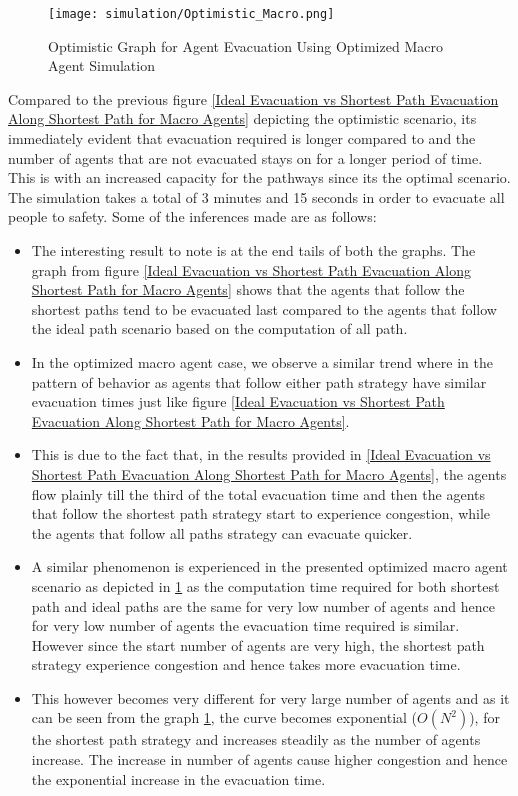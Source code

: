 \begin{figure}[H]
  \centering
  \texttt{[image: simulation/Optimistic\_Macro.png]}
  \caption{Optimistic Graph for Agent Evacuation Using Optimized Macro Agent Simulation}
  \label{Optimistic Graph for Agent Evacuation Using Optimized Macro Agent Simulation}
\end{figure}

Compared to the previous figure \ref{Ideal Evacuation vs Shortest Path Evacuation Along Shortest Path for Macro Agents} depicting the optimistic scenario, its immediately evident that evacuation required is longer compared to and the number of agents that are not evacuated stays on for a longer period of time. This is with an increased capacity for the pathways since its the optimal scenario. The simulation takes a total of 3 minutes and 15 seconds in order to evacuate all people to safety. Some of the inferences made are as follows:

\begin{itemize}
  \item The interesting result to note is at the end tails of both the graphs. The graph from figure \ref{Ideal Evacuation vs Shortest Path Evacuation Along Shortest Path for Macro Agents} shows that the agents that follow the shortest paths tend to be evacuated last compared to the agents that follow the ideal path scenario based on the computation of all path.
  \item In the optimized macro agent case, we observe a similar trend where in the pattern of behavior as agents that follow either path strategy have similar evacuation times just like figure \ref{Ideal Evacuation vs Shortest Path Evacuation Along Shortest Path for Macro Agents}. 
  \item This is due to the fact that, in the results provided in \ref{Ideal Evacuation vs Shortest Path Evacuation Along Shortest Path for Macro Agents}, the agents flow plainly till the third of the total evacuation time and then the agents that follow the shortest path strategy start to experience congestion, while the agents that follow all paths strategy can evacuate quicker.
  \item A similar phenomenon is experienced in the presented optimized macro agent scenario as depicted in \ref{Optimistic Graph for Agent Evacuation Using Optimized Macro Agent Simulation} as the computation time required for both shortest path and ideal paths are the same for very low number of agents and hence for very low number of agents the evacuation time required is similar. However since the start number of agents are very high, the shortest path strategy experience congestion and hence takes more evacuation time.
  \item This however becomes very different for very large number of agents and as it can be seen from the graph \ref{Optimistic Graph for Agent Evacuation Using Optimized Macro Agent Simulation}, the curve becomes exponential ($O(N^2)$), for the shortest path strategy and increases steadily as the number of agents increase. The increase in number of agents cause higher congestion and hence the exponential increase in the evacuation time.
\end{itemize}

